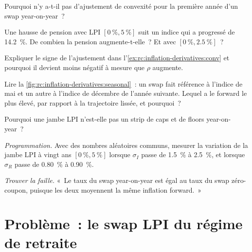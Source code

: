 \begin{exercise}[$\star$]\label{exo:rc:inflation-derivatives:2}
Pourquoi n'y a-t-il pas d'ajustement de convexité pour la première année d'un swap year-on-year~?
\end{exercise}

\begin{exercise}[$\star$]\label{exo:rc:inflation-derivatives:3}
Une hausse de pension avec LPI $[0~\%,5~\%]$ suit un indice qui a progressé de 14.2~\%. De combien
la pension augmente-t-elle~? Et avec $[0~\%,2.5~\%]$~?
\end{exercise}

\begin{exercise}[$\star\star$]\label{exo:rc:inflation-derivatives:4}
Expliquer le signe de l'ajustement dans l'\cref{ex:rc:inflation-derivatives:conv} et pourquoi
il devient moins négatif à mesure que $\rho$ augmente.
\end{exercise}

\begin{exercise}[$\star\star$]\label{exo:rc:inflation-derivatives:5}
Lire la \cref{fig:rc:inflation-derivatives:seasonal}~: un swap fait référence à l'indice de mai et un
autre à l'indice de décembre de l'année suivante. Lequel a le forward le plus élevé, par rapport
à la trajectoire lissée, et pourquoi~?
\end{exercise}

\begin{exercise}[$\star\star$]\label{exo:rc:inflation-derivatives:6}
Pourquoi une jambe LPI n'est-elle pas un strip de caps et de floors year-on-year~?
\end{exercise}

\begin{exercise}[$\star\star\star$]\label{exo:rc:inflation-derivatives:7}
\emph{Programmation.} Avec des nombres aléatoires communs, mesurer la variation de la jambe LPI
à vingt ans $[0~\%,5~\%]$ lorsque $\sigma_I$ passe de 1.5~\% à 2.5~\%, et lorsque $\sigma_R$ passe de 0.80~\% à
0.90~\%.
\end{exercise}

\begin{exercise}[$\star\star\star$]\label{exo:rc:inflation-derivatives:8}
\emph{Trouver la faille.} «~Le taux du swap year-on-year est égal au taux du swap zéro-coupon,
puisque les deux moyennent la même inflation forward.~»
\end{exercise}

\section{Problème~: le swap LPI du régime de retraite}

